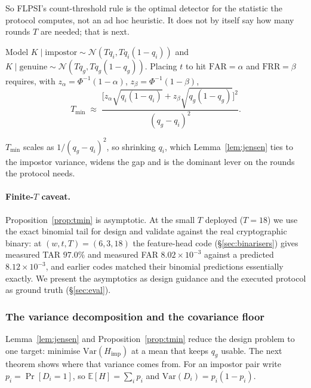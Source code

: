 So FLPSI's count-threshold rule is the optimal detector for the statistic the protocol computes, not
an ad hoc heuristic. It does not by itself say how many rounds $T$ are needed; that is next.

\begin{proposition}[Required $T$]
\label{prop:tmin}
Model $K \mid \text{impostor} \sim \mathcal{N}(Tq_i, Tq_i(1-q_i))$ and $K \mid \text{genuine} \sim
\mathcal{N}(Tq_g, Tq_g(1-q_g))$. Placing $t$ to hit $\mathrm{FAR}=\alpha$ and $\mathrm{FRR}=\beta$
requires, with $z_\alpha=\Phi^{-1}(1-\alpha)$, $z_\beta=\Phi^{-1}(1-\beta)$,
\begin{equation}
\label{eq:tmin-gauss}
T_{\min} \;\approx\; \frac{\bigl[z_\alpha\sqrt{q_i(1-q_i)} + z_\beta\sqrt{q_g(1-q_g)}\bigr]^2}
{(q_g - q_i)^2}.
\end{equation}
\end{proposition}

$T_{\min}$ scales as $1/(q_g-q_i)^2$, so shrinking $q_i$, which Lemma~\ref{lem:jensen} ties to the
impostor variance, widens the gap and is the dominant lever on the rounds the protocol needs.

\paragraph{Finite-$T$ caveat.} Proposition~\ref{prop:tmin} is asymptotic. At the small $T$ deployed
($T=18$) we use the exact binomial tail for design and validate against the real cryptographic binary:
at $(w,t,T) = (6,3,18)$ the feature-head code (\S\ref{sec:binarisers}) gives measured TAR $97.0\%$ and
measured FAR $8.02\times10^{-3}$ against a predicted $8.12\times10^{-3}$, and earlier codes matched
their binomial predictions essentially exactly. We present the asymptotics as design guidance and the
executed protocol as ground truth (\S\ref{sec:eval}).

\subsubsection{The variance decomposition and the covariance floor}

Lemma~\ref{lem:jensen} and Proposition~\ref{prop:tmin} reduce the design problem to one target:
minimise $\mathrm{Var}(H_{\mathrm{imp}})$ at a mean that keeps $q_g$ usable. The next theorem shows
where that variance comes from. For an impostor pair write $p_i = \Pr[D_i=1]$, so $\mathbb{E}[H] =
\sum_i p_i$ and $\mathrm{Var}(D_i) = p_i(1-p_i)$.

